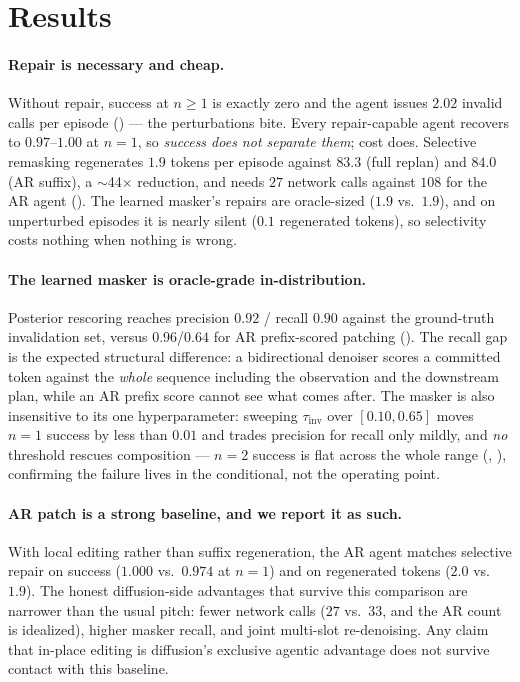 \documentclass{article}
\newcommand{\tinv}{\tau_{\mathrm{inv}}}
\begin{document}
\section{Results}

\paragraph{Repair is necessary and cheap.} Without repair, success at $n{\geq}1$ is exactly zero and
the agent issues $2.02$ invalid calls per episode () --- the perturbations bite. Every
repair-capable agent recovers to $0.97$--$1.00$ at $n{=}1$, so \emph{success does not separate them};
cost does. Selective remasking regenerates $1.9$ tokens per episode against $83.3$ (full replan) and
$84.0$ (AR suffix), a $\sim$44$\times$ reduction, and needs $27$ network calls against $108$ for the
AR agent (). The learned masker's repairs are oracle-sized ($1.9$ vs.\ $1.9$), and
on unperturbed episodes it is nearly silent ($0.1$ regenerated tokens), so selectivity costs nothing
when nothing is wrong.

\paragraph{The learned masker is oracle-grade in-distribution.} Posterior rescoring reaches precision $0.92$ / recall $0.90$ against the ground-truth
invalidation set, versus $0.96$/$0.64$ for AR prefix-scored patching (). The recall
gap is the expected structural difference: a bidirectional denoiser scores a committed token against
the \emph{whole} sequence including the observation and the downstream plan, while an AR prefix score
cannot see what comes after. The masker is also insensitive to its one hyperparameter: sweeping
$\tinv$ over $[0.10, 0.65]$ moves $n{=}1$ success by less than $0.01$ and trades precision for
recall only mildly, and \emph{no} threshold rescues composition --- $n{=}2$ success is flat across
the whole range (, ), confirming the failure lives in the
conditional, not the operating point.

\paragraph{AR patch is a strong baseline, and we report it as such.} With local editing rather than
suffix regeneration, the AR agent matches selective repair on success ($1.000$ vs.\ $0.974$ at
$n{=}1$) and on regenerated tokens ($2.0$ vs.\ $1.9$). The honest diffusion-side advantages that
survive this comparison are narrower than the usual pitch: fewer network calls ($27$ vs.\ $33$, and
the AR count is idealized), higher masker recall, and joint multi-slot re-denoising. Any claim that
in-place editing is diffusion's exclusive agentic advantage does not survive contact with this
baseline.
\end{document}
